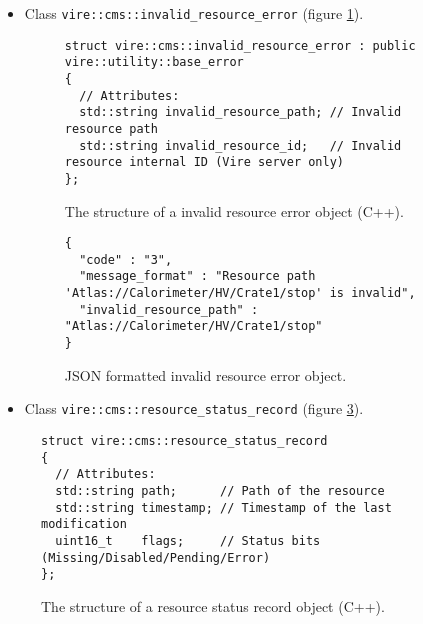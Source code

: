 \begin{itemize}

\item
Class \texttt{vire::cms::invalid\_resource\_error} (figure \ref{fig-app-payload-invalid_resource_error}).

\begin{center}
\end{center}

\begin{figure}[h]
\vskip 10pt
\small
\begin{Verbatim}[frame=single,xleftmargin=0.cm,label=\fbox{C++}]
struct vire::cms::invalid_resource_error : public vire::utility::base_error
{
  // Attributes:
  std::string invalid_resource_path; // Invalid resource path
  std::string invalid_resource_id;   // Invalid resource internal ID (Vire server only)
};
\end{Verbatim}
\normalsize
\caption{The structure  of a invalid resource error object (C++).}
\label{fig-app-payload-invalid_resource_error}
\end{figure}

\begin{figure}[h]
\vskip 10pt
\small
\begin{Verbatim}[frame=single,xleftmargin=0.cm,label=\fbox{JSON++}]
{
  "code" : "3",
  "message_format" : "Resource path 'Atlas://Calorimeter/HV/Crate1/stop' is invalid",
  "invalid_resource_path" : "Atlas://Calorimeter/HV/Crate1/stop"
}
\end{Verbatim}
\normalsize
\caption{JSON formatted invalid resource error object.}
\label{fig-app-payload-invalid_resource_error-json}
\end{figure}


\item
Class     \texttt{vire::cms::resource\_status\_record}    (figure
\ref{fig-app-payload-resource_status_record}).

\end{itemize}

\begin{figure}[h]
\vskip 10pt
\small
\begin{Verbatim}[frame=single,xleftmargin=0.cm,label=\fbox{C++}]
struct vire::cms::resource_status_record
{
  // Attributes:
  std::string path;      // Path of the resource
  std::string timestamp; // Timestamp of the last modification
  uint16_t    flags;     // Status bits (Missing/Disabled/Pending/Error)
};
\end{Verbatim}
\normalsize
\caption{The structure  of a resource status record object (C++).}
\label{fig-app-payload-resource_status_record}
\end{figure}


